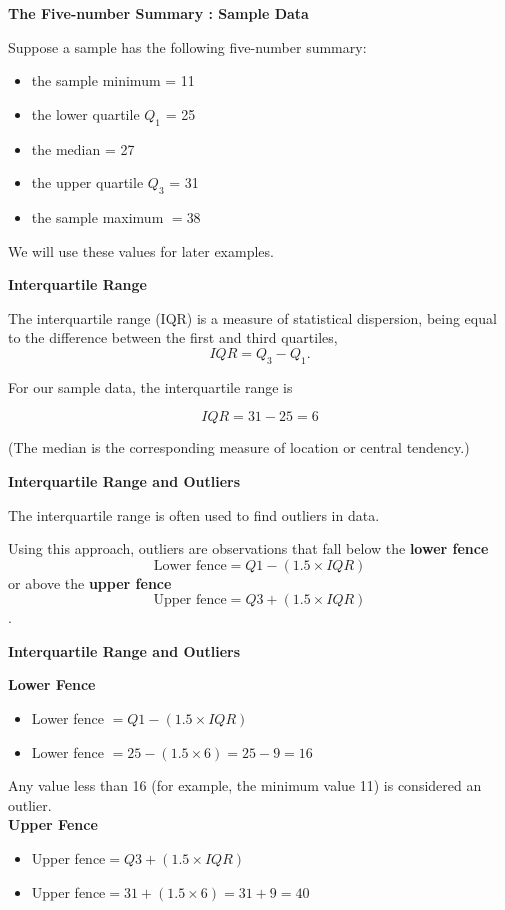 ﻿\documentclass[]{report}
\begin{document}
\textbf{The Five-number Summary : Sample Data}

Suppose a sample has the following five-number summary: 
\begin{itemize}
\item the sample minimum = 11
\item the lower quartile $Q_1$ = 25
\item the median = 27
\item the upper quartile $Q_3$ = 31
\item the sample maximum $ = 38$
\end{itemize}
We will use these values for later examples.


\textbf{Interquartile Range}

The interquartile range (IQR) is a measure of statistical dispersion, being equal to the difference between the first and third quartiles,
\[IQR = Q_3 -  Q_1. \]

For our sample data, the interquartile range is 

\[IQR = 31 -  25 = 6 \]

(The median is the corresponding measure of location or central tendency.)


\textbf{Interquartile Range and Outliers}

The interquartile range is often used to find outliers in data.

Using this approach, outliers are observations that fall below the \textbf{lower fence} \[\mbox{Lower fence} = Q1 - (1.5\times IQR)\] or above the \textbf{upper fence} \[\mbox{Upper fence} = Q3 + (1.5 \times IQR)\].


\textbf{Interquartile Range and Outliers}

\textbf{Lower Fence}
\begin{itemize}
\item Lower fence $= Q1 - (1.5\times IQR)$
\item Lower fence $= 25 - (1.5\times 6) = 25 - 9 = 16$
\end{itemize}
Any value less than 16 (for example, the minimum value 11) is considered an outlier.\\


\textbf{Upper Fence}
\begin{itemize}
\item Upper fence$ = Q3 + (1.5 \times IQR)$
\item Upper fence$= 31 + (1.5\times 6) = 31 + 9 = 40$
\end{itemize}
\end{document}
